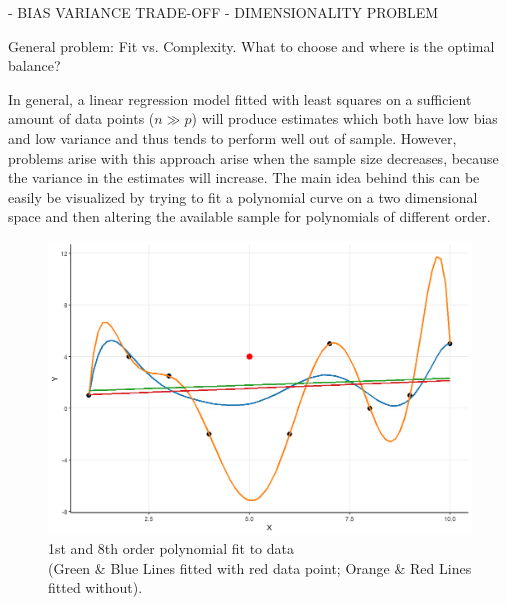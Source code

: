 \documentclass[12pt,a4paper]{article}
\newenvironment{lightbluebox}{%
    \begin{tcolorbox}[colback=lightblue, colframe=lightblue, fontupper=\itshape]%
}{%
    \end{tcolorbox}%
}
\begin{document}
\begin{lightbluebox}
- BIAS VARIANCE TRADE-OFF
- DIMENSIONALITY PROBLEM

General problem: Fit vs. Complexity. What to choose and where is the optimal balance?
\end{lightbluebox}

In general, a linear regression model fitted with least squares on a sufficient amount of data points ($n \gg p$) will produce estimates which both have low bias and low variance and thus tends to perform well out of sample. However, problems arise with this approach arise when the sample size decreases, because the variance in the estimates will increase. The main idea behind this can be easily be visualized by trying to fit a polynomial curve on a two dimensional space and then altering the available sample for polynomials of different order. 
\begin{figure}
\centering
\includegraphics[scale=0.5]{PolynomialFit_Plot.png}
\caption{1st and 8th order polynomial fit to data \\ (\textcolor{green1}{Green} \& \textcolor{blue1}{Blue} Lines fitted with red data point; \textcolor{orange1}{Orange} \& \textcolor{red1}{Red} Lines fitted without).}
\label{fig:polyfit}
\end{figure}
\end{document}
